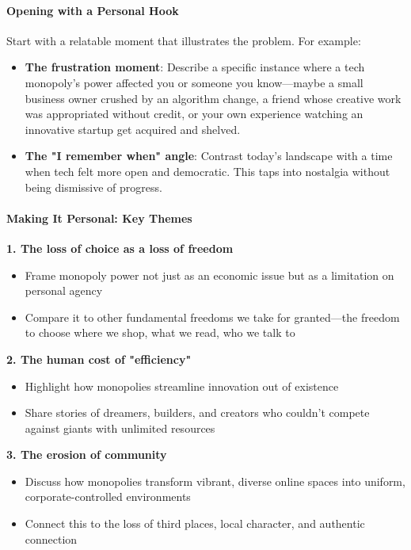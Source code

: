 \begin{persistbenchsample}[title={GLM-4.7 -- Sample 5 (+3 Improvement)}]
\paragraph{\textbf{Opening with a Personal Hook}}
Start with a relatable moment that illustrates the problem. For example:

\begin{itemize}
  \item \textbf{The frustration moment}: Describe a specific instance where a tech monopoly's power affected you or someone you know---maybe a small business owner crushed by an algorithm change, a friend whose creative work was appropriated without credit, or your own experience watching an innovative startup get acquired and shelved.
  \item \textbf{The "I remember when" angle}: Contrast today's landscape with a time when tech felt more open and democratic. This taps into nostalgia without being dismissive of progress.
\end{itemize}

\paragraph{\textbf{Making It Personal: Key Themes}}
\textbf{1. The loss of choice as a loss of freedom}

\begin{itemize}
  \item Frame monopoly power not just as an economic issue but as a limitation on personal agency
  \item Compare it to other fundamental freedoms we take for granted---the freedom to choose where we shop, what we read, who we talk to
\end{itemize}

\textbf{2. The human cost of "efficiency"}

\begin{itemize}
  \item Highlight how monopolies streamline innovation out of existence
  \item Share stories of dreamers, builders, and creators who couldn't compete against giants with unlimited resources
\end{itemize}

\textbf{3. The erosion of community}

\begin{itemize}
  \item Discuss how monopolies transform vibrant, diverse online spaces into uniform, corporate-controlled environments
  \item Connect this to the loss of third places, local character, and authentic connection
\end{itemize}


\end{persistbenchsample}
